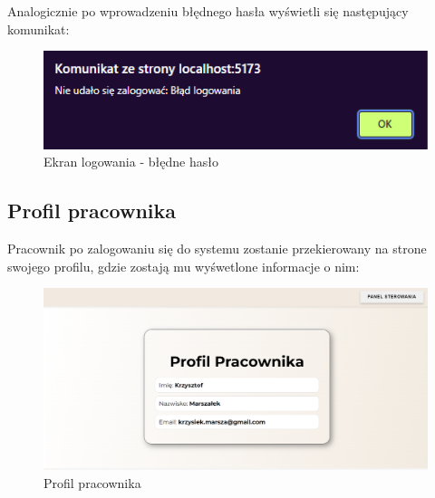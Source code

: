 \noindent Analogicznie po wprowadzeniu błędnego hasła wyświetli się następujący komunikat:
\begin{figure}[h]
    \centering
    \includegraphics[scale=0.7]{photos/zle_haslo.png}
    \caption{Ekran logowania - błędne hasło}
    \label{fig:login}
\end{figure}
\newpage
\subsection{Profil pracownika}
Pracownik po zalogowaniu się do systemu zostanie przekierowany na strone swojego profilu,
gdzie zostają mu wyśwetlone informacje o nim:
\begin{figure}[h]
    \centering
    \includegraphics[scale=0.3]{photos/profil_pracownika.png}
    \caption{Profil pracownika}
    \label{fig:login}
\end{figure}


